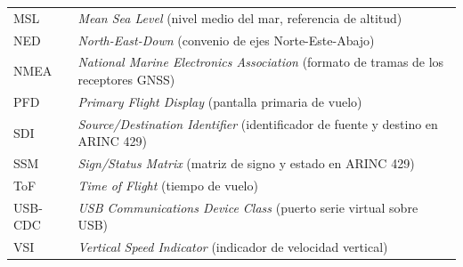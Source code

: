 \begin{xltabular}{\linewidth}{@{} l X @{}}
    MSL     & \textit{Mean Sea Level} (nivel medio del mar, referencia de altitud) \\
    NED     & \textit{North-East-Down} (convenio de ejes Norte-Este-Abajo) \\
    NMEA    & \textit{National Marine Electronics Association} (formato de tramas de los receptores GNSS) \\
    PFD     & \textit{Primary Flight Display} (pantalla primaria de vuelo) \\
    SDI     & \textit{Source/Destination Identifier} (identificador de fuente y destino en ARINC 429) \\
    SSM     & \textit{Sign/Status Matrix} (matriz de signo y estado en ARINC 429) \\
    ToF     & \textit{Time of Flight} (tiempo de vuelo) \\
    USB-CDC & \textit{USB Communications Device Class} (puerto serie virtual sobre USB) \\
    VSI     & \textit{Vertical Speed Indicator} (indicador de velocidad vertical) \\
\end{xltabular}

\null